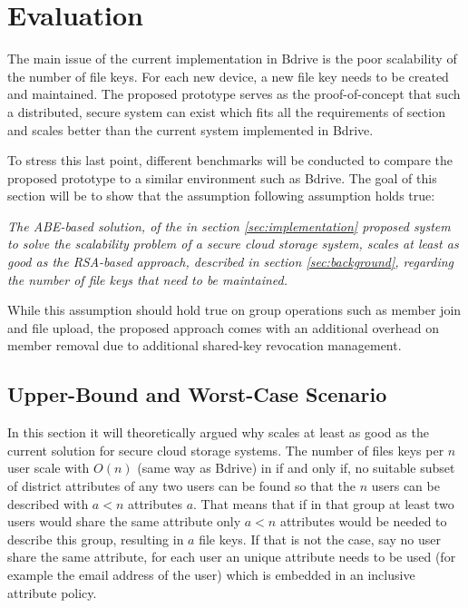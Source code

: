 \chapter{Evaluation}

The main issue of the current implementation in Bdrive is the poor scalability of the number of file keys. For each new device, a new file key needs to be created and maintained. The proposed prototype serves as the proof-of-concept that such a distributed, secure system can exist which fits all the requirements of section  and scales better than the current system implemented in Bdrive. 

To stress this last point, different benchmarks will be conducted to compare the proposed prototype to a similar environment such as Bdrive. The goal of this section will be to show that the assumption following assumption holds true:

\begin{center}
\textit{The ABE-based solution, of the in section \ref{sec:implementation} proposed system to solve the scalability problem of a secure cloud storage system, scales at least as good as the RSA-based approach, described in section \ref{sec:background}, regarding the number of file keys that need to be maintained.}
\end{center}

While this assumption should hold true on group operations such as member join and file upload, the proposed approach comes with an additional overhead on member removal due to additional shared-key revocation management. 

\section{Upper-Bound and Worst-Case Scenario}
\label{sec:upper-bound-and-worst-case-scenario}
In this section it will theoretically argued why \name scales at least as good as the current solution for secure cloud storage systems. The number of files keys per $n$ user scale with $O(n)$ (same way as Bdrive) in \name if and only if, no suitable subset of district attributes of any two users can be found so that the $n$ users can be described with $a < n$ attributes $a$. 
That means that if in that group at least two users would share the same attribute only $a < n$ attributes would be needed to describe this group, resulting in $a$ file keys. 
If that is not the case, say no user share the same attribute, for each user an unique attribute needs to be used (for example the email address of the user) which is embedded in an inclusive attribute policy. 

